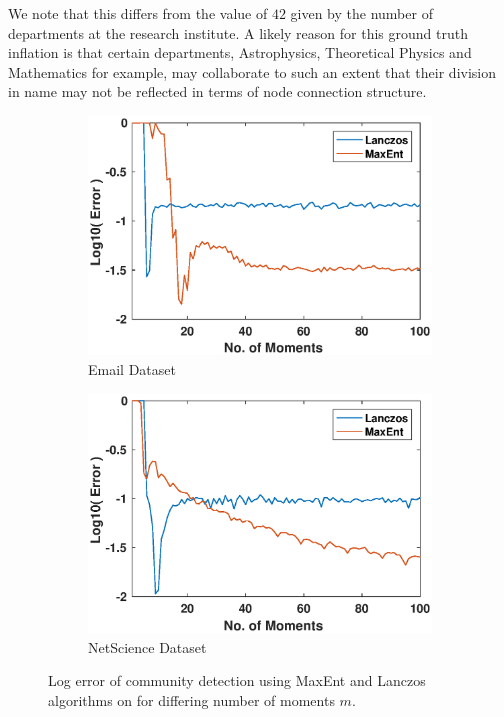 \documentclass[letterpaper]{article} %
\begin{document}
We note that this differs from the value of $42$ given by the number of departments at the research institute. A likely reason for this ground truth inflation is that certain departments, Astrophysics, Theoretical Physics and Mathematics for example, may collaborate to such an extent that their division in name may not be reflected in terms of node connection structure.


\begin{figure}[t]
	\centering
	\begin{subfigure}
		\centering
		\includegraphics[trim=0.1cm 0cm 0.5cm 0.1cm, clip, width=1.0\linewidth]{Figures/Error_for_EmailL.eps}
		\caption{Email Dataset}
		\label{fig:emailerror}	
	\end{subfigure}%
	
	\begin{subfigure}
		\centering
		\includegraphics[trim=0.1cm 0cm 0.5cm 0.1cm, clip,  width=1.0\linewidth]{Figures/Error_for_NetscienceL.eps}
		\caption{NetScience Dataset}
		\label{fig:netscienceerror}
	\end{subfigure}
	\caption{Log error of community detection using MaxEnt and Lanczos algorithms on for differing number of moments $m$.}
	\label{fig:netscience}
\end{figure}
\end{document}
